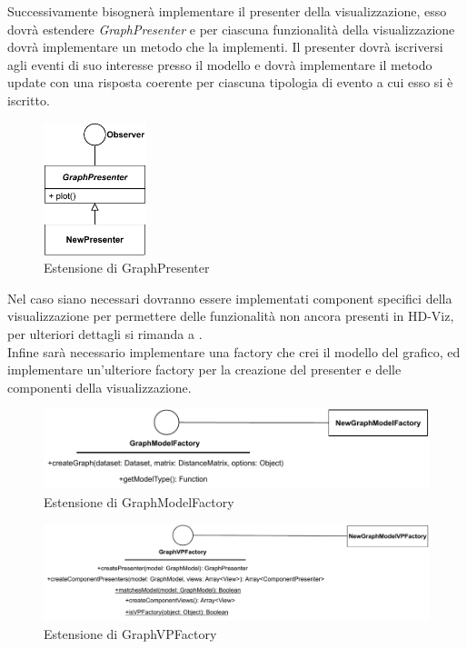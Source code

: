 \documentclass[../manuale_sviluppatore.tex]{subfiles}
\begin{document}
Successivamente bisognerà implementare il presenter della visualizzazione, esso dovrà estendere 
\emph{GraphPresenter} e per ciascuna funzionalità della visualizzazione dovrà implementare un metodo 
che la implementi. Il presenter dovrà iscriversi agli eventi di suo interesse presso il modello e 
dovrà implementare il metodo update con una risposta coerente per ciascuna tipologia di evento a cui 
esso si è iscritto.\\

\begin{figure}[H]
	\centering
	\includegraphics[width=3cm]{img/extendPresenter.pdf}
	\caption{Estensione di GraphPresenter}
\end{figure}


Nel caso siano necessari dovranno essere implementati component specifici della visualizzazione per 
permettere delle funzionalità non ancora presenti in HD-Viz, per ulteriori dettagli si rimanda a 
.\\

Infine sarà necessario implementare una factory che crei il modello del grafico, ed implementare 
un'ulteriore factory per la creazione del presenter e delle componenti della visualizzazione.

\begin{figure}[H]
	\centering
	\includegraphics[width=12cm]{img/extendModelFactory.pdf}
	\caption{Estensione di GraphModelFactory}
\end{figure}

\begin{figure}[H]
	\centering
	\includegraphics[width=15cm]{img/extendVPFactory.pdf}
	\caption{Estensione di GraphVPFactory}
\end{figure}
\end{document}
